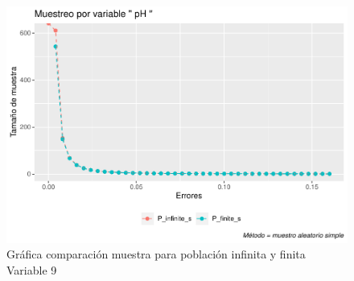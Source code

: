 \documentclass[
]{article}
\begin{document}
\begin{figure}
\centering
\includegraphics{1_examen_solucion_files/figure-latex/grafica va9-1.pdf}
\caption{Gráfica comparación muestra para población infinita y finita
Variable 9}
\end{figure}
\end{document}
